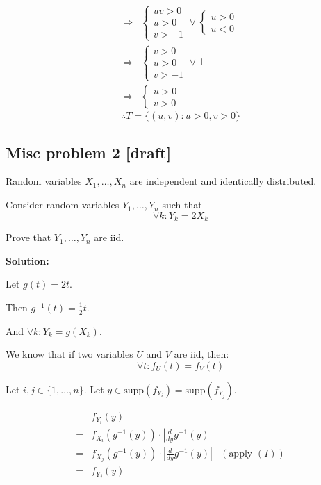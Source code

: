 \documentclass{article}
\begin{document}
\begin{ssolution}
\begin{align*}
	\Rightarrow& \begin{cases}uv > 0 \\ u > 0 \\ v > -1\end{cases}
	        \vee \begin{cases}u > 0 \\ u < 0\end{cases} \\
	\Rightarrow& \begin{cases}v > 0 \\ u > 0 \\ v > -1\end{cases} \vee \bot \\
	\Rightarrow& \begin{cases}u > 0 \\ v > 0\end{cases}
\end{align*}
\[\therefore T = \{(u,v) : u>0 , v>0\}\]
\end{ssolution}

\subsection{Misc problem 2 [draft]}

Random variables \(X_1,\ldots,X_n\) are independent and identically distributed.

Consider random variables \(Y_1,\ldots, Y_n\) such that
\[\forall k:Y_k=2X_k\]

Prove that \(Y_1,\ldots,Y_n\) are iid.

\textbf{Solution:}

Let \(g(t) = 2t\).

Then \(g^{-1}(t) = \frac12 t\).

And \(\forall k: Y_k=g(X_k)\).

We know that if two variables \(U\) and \(V\) are iid, then:
\[\forall t: f_U(t) = f_V(t) \tag{1}\]

Let \(i,j\in \{1,\ldots,n\}\). Let \(y\in \text{supp}(f_{Y_i})=\text{supp}(f_{Y_j})\).

\begin{align*}
     & f_{Y_i}(y) \\
    =& f_{X_i}(g^{-1}(y)) \cdot \left|\frac{d}{dy} g^{-1}(y)\right| \\
    =& f_{X_j}(g^{-1}(y)) \cdot \left|\frac{d}{dy} g^{-1}(y)\right| & (\text{apply } (I)) \\
    =& f_{Y_j}(y)
\end{align*}
\end{document}
